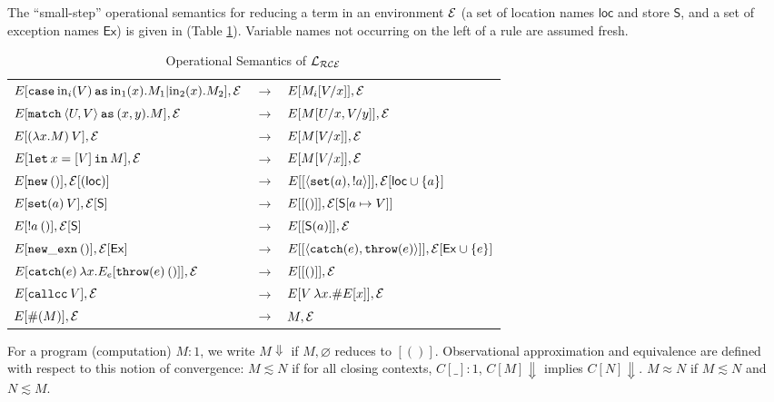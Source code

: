 \documentclass{eptcs}
\def\lra{\longrightarrow}
\def\E{{\cal E}}
\newcommand{\xs}{{\mathsf{S}}}
\newcommand{\loc}{{\mathsf{loc}}}
\newcommand{\ex}{{\mathsf{Ex}}}
\newcommand{\cse}{{\mathtt{case}}}
\newcommand{\as}{{\mathtt{as}}}
\newcommand{\match}{{\mathtt{match}}}
\newcommand{\throw}{{\mathtt{throw}}}
\newcommand{\set}{{\mathtt{set}}}
\newcommand{\lett}{{\mathtt{let}}}
\newcommand{\spc}{\hspace{2pt}}
\newcommand{\inj}{\mathrm{in}}
\newcommand{\callcc}{{\mathtt{callcc}}}
\newcommand{\Lce}{{\cal{L_{RCE}}}}
\newcommand{\nxn}{{\mathtt{new\_exn}}}
\newcommand{\new}{{\mathtt{new}}}
\newcommand{\ski}{[()]}
\newcommand{\catch}{{\mathtt{catch}}}
\newcommand{\com}{{{1}}}
\newcommand{\inn}{{{\mathtt{in}}}}
\begin{document}
The  ``small-step'' operational semantics for reducing a term in an environment $\E$ (a set of location names $\loc$ and store $\xs$, and a set of exception names $\ex$)  is given in  (Table \ref{ops2}). Variable names not occurring on the left of a rule are assumed fresh.
\begin{table}
\begin{center}
\begin{tabular}{l c l}
$E[\cse\spc \inj_i(V)\spc  \as \spc \inj_1(x).M_1|\inj_2(x).M_2],\E$&$ \lra$&$ E[M_i[V/x]],\E$ \\ 
$E[\match \spc  \langle U,V\rangle \spc \as\spc(x,y).M],\E$ &$\lra$&$ E[M[U/x,V/y]],\E$\\
$E[(\lambda x.M)\spc V],\E$&$ \lra$&$ E[M[V/x]],\E$ \\ $E[\lett \spc x = [V]\spc \inn\spc M],\E$ &$ \lra $&$ E[M[V/x]],\E$\\
$E[\new\spc ()],\E[(\loc)]$ & $\lra$ &$  E[[\langle \set(a),!a\rangle]],\E[\loc\cup\{a\}]$ \\
$E[\set(a) \spc V],\E[\xs] $&$\lra$&$ E[[()]],\E[\xs[a \mapsto V]]$ \\$E[!a\spc ()],\E[\xs]$ &$\lra$&$ E[[\xs(a)]],\E$\\ 
 $E[\nxn\spc ()],\E[\ex]$&$\lra$&$ E[[\langle \catch(e),\throw(e)\rangle]],\E[\ex\cup\{e\}]$ \\
$E[\catch(e)\spc \lambda x.E_e[\throw(e)\spc ()]],\E $&$\lra$&$ E[[()]],\E$ \\
$E[\callcc\spc V], \E$ &$\lra $ & $ E[V\spc \lambda x.\#E[x]],\E$\\
$E[\#(M)],\E $ &$\lra $ & $M,\E$

\end{tabular}
\caption{Operational Semantics of $\Lce$}\label{ops2}
\end{center} 
\end{table}
For a program (computation) $M:\com$, we write $M\Downarrow$ if $M,\varnothing$ reduces to $\ski$. Observational approximation and  equivalence are defined with respect to this  notion of convergence: $M \lesssim N$ if for all closing contexts, $C[\_]:\com$, $C[M] \Downarrow$ implies $C[N]\Downarrow$. $M \approx N$ if $M \lesssim N$ and $N \lesssim M$.
\end{document}
